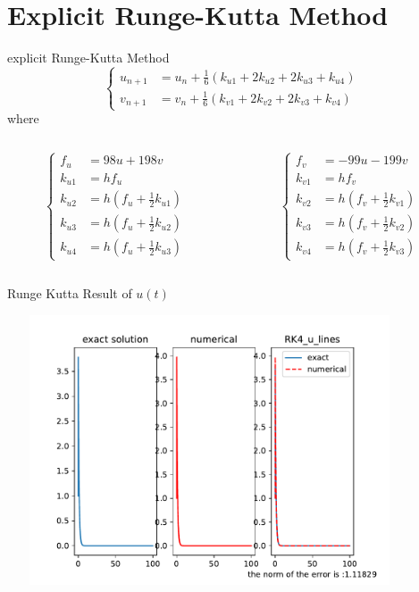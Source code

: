 \documentclass{beamer}
\begin{document}
 \section{Explicit Runge-Kutta Method}
 \begin{frame}{explicit Runge-Kutta Method}
    \[
        \begin{cases}
            u_{n+1} &= u_n +\frac{1}{6}(k_{u1}+2k_{u2}+2k_{u3}+k_{u4})\\
            v_{n+1} &= v_n +\frac{1}{6}(k_{v1}+2k_{v2}+2k_{v3}+k_{v4})
        \end{cases}
        \]
    where 
    \begin{columns}[T] %
        \begin{column}{.48\textwidth}
            \[
                \begin{cases}
                    f_u&=98u+198v\\
                    k_{u1}&=hf_u\\
                    k_{u2}&=h(f_u+\frac{1}{2}k_{u1})\\
                    k_{u3}&=h(f_u+\frac{1}{2}k_{u2})\\
                    k_{u4}&=h(f_u+\frac{1}{2}k_{u3})
                \end{cases}
                \]
    
        \end{column}%
        \hfill%
        \begin{column}{.48\textwidth}
            \[
                \begin{cases}
                    f_v&=-99u-199v\\
                    k_{v1}&=hf_v\\
                    k_{v2}&=h(f_v+\frac{1}{2}k_{v1})\\
                    k_{v3}&=h(f_v+\frac{1}{2}k_{v2})\\
                    k_{v4}&=h(f_v+\frac{1}{2}k_{v3})
                \end{cases}
                \]
        
        \end{column}
    \end{columns}
 \end{frame}
 \begin{frame}{Runge Kutta Result of $u(t)$}

    \centering
    \includegraphics[height=8cm,width=12cm]{RK4_u_lines.pdf}
 \end{frame}
\end{document}
